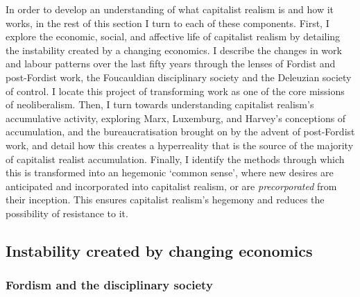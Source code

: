 In order to develop an understanding of what capitalist realism is and how it works, in the rest of this section I turn to each of these components. First, I explore the economic, social, and affective life of capitalist realism by detailing the instability created by a changing economics. I describe the changes in work and labour patterns over the last fifty years through the lenses of Fordist and post-Fordist work, the Foucauldian disciplinary society and the Deleuzian society of control. I locate this project of transforming work as one of the core missions of neoliberalism. Then, I turn towards understanding capitalist realism's accumulative activity, exploring Marx, Luxemburg, and Harvey's conceptions of accumulation, and the bureaucratisation brought on by the advent of post-Fordist work, and detail how this creates a hyperreality that is the source of the majority of capitalist realist accumulation. Finally, I identify the methods through which this is transformed into an hegemonic `common sense', where new desires are anticipated and incorporated into capitalist realism, or are \emph{precorporated} from their inception. This ensures capitalist realism's hegemony and reduces the possibility of resistance to it.

\subsection{Instability created by changing economics}
\label{subsec:2-instability}

\subsubsection{Fordism and the disciplinary society}
\label{subsubsec:fordism-and-the-disciplinary-society}

